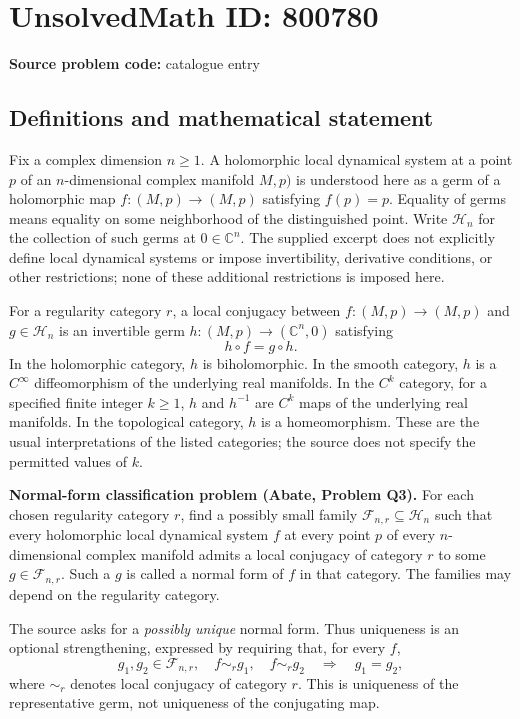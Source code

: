 \documentclass[11pt]{article}
\newcommand{\C}{\mathbb{C}}
\begin{document}
\section*{UnsolvedMath ID: 800780}
\textbf{Source problem code:} catalogue entry
\subsection{Definitions and mathematical statement}
Fix a complex dimension \(n\geq 1\). A holomorphic local dynamical system at a point \(p\) of an \(n\)-dimensional complex manifold \(M,p)\) is understood here as a germ of a holomorphic map \(f:(M,p)\to(M,p)\) satisfying \(f(p)=p\). Equality of germs means equality on some neighborhood of the distinguished point. Write \(\mathcal H_n\) for the collection of such germs at \(0\in\C^n\). The supplied excerpt does not explicitly define local dynamical systems or impose invertibility, derivative conditions, or other restrictions; none of these additional restrictions is imposed here.

For a regularity category \(r\), a local conjugacy between \(f:(M,p)\to(M,p)\) and \(g\in\mathcal H_n\) is an invertible germ \(h:(M,p)\to(\C^n,0)\) satisfying
\[
 h\circ f=g\circ h.
\]
In the holomorphic category, \(h\) is biholomorphic. In the smooth category, \(h\) is a \(C^\infty\) diffeomorphism of the underlying real manifolds. In the \(C^k\) category, for a specified finite integer \(k\geq1\), \(h\) and \(h^{-1}\) are \(C^k\) maps of the underlying real manifolds. In the topological category, \(h\) is a homeomorphism. These are the usual interpretations of the listed categories; the source does not specify the permitted values of \(k\).

\textbf{Normal-form classification problem (Abate, Problem Q3).} For each chosen regularity category \(r\), find a possibly small family \(\mathcal F_{n,r}\subseteq\mathcal H_n\) such that every holomorphic local dynamical system \(f\) at every point \(p\) of every \(n\)-dimensional complex manifold admits a local conjugacy of category \(r\) to some \(g\in\mathcal F_{n,r}\). Such a \(g\) is called a normal form of \(f\) in that category. The families may depend on the regularity category.

The source asks for a \emph{possibly unique} normal form. Thus uniqueness is an optional strengthening, expressed by requiring that, for every \(f\),
\[
 g_1,g_2\in\mathcal F_{n,r},\quad
 f\sim_r g_1,\quad f\sim_r g_2
 \quad\Longrightarrow\quad g_1=g_2,
\]
where \(\sim_r\) denotes local conjugacy of category \(r\). This is uniqueness of the representative germ, not uniqueness of the conjugating map.
\end{document}
